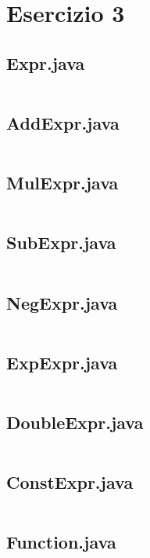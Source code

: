 \section*{Esercizio 3}

\subsection*{Expr.java}
\inputminted{java}{tex/src/3/Expr.java}

\subsection*{AddExpr.java}
\inputminted{java}{tex/src/3/AddExpr.java}

\subsection*{MulExpr.java}
\inputminted{java}{tex/src/3/MulExpr.java}

\subsection*{SubExpr.java}
\inputminted{java}{tex/src/3/SubExpr.java}

\subsection*{NegExpr.java}
\inputminted{java}{tex/src/3/NegExpr.java}

\subsection*{ExpExpr.java}
\inputminted{java}{tex/src/3/ExpExpr.java}

\subsection*{DoubleExpr.java}
\inputminted{java}{tex/src/3/DoubleExpr.java}

\subsection*{ConstExpr.java}
\inputminted{java}{tex/src/3/ConstExpr.java}

\subsection*{Function.java}
\inputminted{java}{tex/src/3/Function.java}
